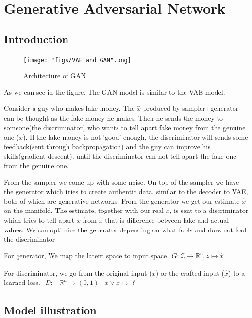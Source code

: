\section{Generative Adversarial Network}
\subsection{Introduction}
\begin{figure}
    \centering
    \texttt{[image: "figs/VAE and GAN".png]}
    \caption{Architecture of GAN}
    \label{fig:gan_arch}
\end{figure}

As we can see in the figure. The GAN model is similar to the VAE model.

Consider a guy who makes fake money. The $\hat{x}$ produced by sampler+generator can be thought as the fake money he makes. Then he sends the money to someone(the discriminator) who wants to tell apart fake money from the genuine one ($x$). If the fake money is not 'good' enough, the discriminator will sends some feedback(sent through backpropagation) and the guy can improve his skills(gradient descent), until the discriminator can not tell apart the fake one from the genuine one.

From the sampler we come up with some noise. On top of the sampler we have the generator which tries to create authentic data, similar to the decoder to VAE, both of which are generative networks. From the generator we get our estimate $\hat{x}$on the manifold. The estimate, together with our real $x$, is sent to a discriminator which tries to tell apart $x$ from $\hat{x}$ that is difference between fake and actual values. We can optimize the generator depending on what fools and does not fool the discriminator

For generator, We map the latent space to input space $\begin{array}{r}{G : \mathcal{Z} \rightarrow \mathbb{R}^{n}}, {z \mapsto \hat{x}}\end{array}$

For discriminator, we go from the original input ($x$) or the crafted input ($\hat{x}$) to a learned loss. $\begin{aligned} D : & \mathbb{R}^{n} \rightarrow(0,1) & x \vee \hat{x} \mapsto \ell \end{aligned}$

\subsection{Model illustration}

